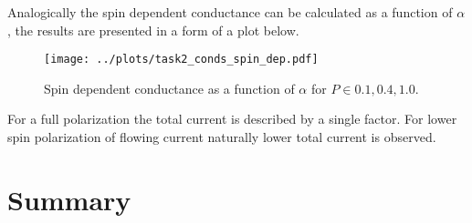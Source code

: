 \documentclass[12pt,a4]{article}
\begin{document}
Analogically the spin dependent conductance can be calculated as a function of $\alpha$, the results are presented in a form of a plot below.


\begin{figure}[H]
	\centering
	\texttt{[image: ../plots/task2\_conds\_spin\_dep.pdf]}
	\caption{Spin dependent conductance as a function of $\alpha$ for $P\in{0.1, 0.4, 1.0}$.}
\end{figure}

For a full polarization the total current is described by a single factor. For lower spin polarization of flowing current naturally lower total current is observed.


\section*{Summary}



 
\end{document}
